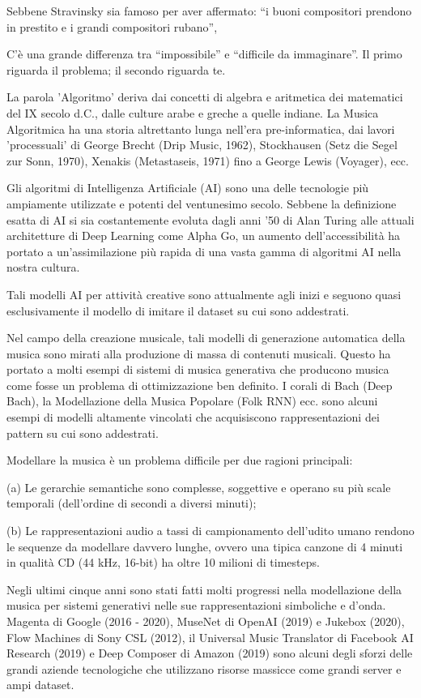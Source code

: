 \documentclass[a4paper,12pt]{report}
\begin{document}
Sebbene Stravinsky sia famoso per aver affermato: “i buoni compositori prendono in prestito e i grandi compositori rubano”, 

C’è una grande differenza tra “impossibile” e “difficile da immaginare”. 
Il primo riguarda il problema; il secondo riguarda te.

La parola 'Algoritmo' deriva dai concetti di algebra e aritmetica dei matematici del IX secolo d.C., dalle culture arabe e greche a quelle indiane. 
La Musica Algoritmica ha una storia altrettanto lunga nell'era pre-informatica, dai lavori 'processuali' di George Brecht (Drip Music, 1962), Stockhausen (Setz die Segel zur Sonn, 1970), Xenakis (Metastaseis, 1971) fino a George Lewis (Voyager), ecc.

Gli algoritmi di Intelligenza Artificiale (AI) sono una delle tecnologie più ampiamente utilizzate e potenti del ventunesimo secolo. Sebbene la definizione esatta di AI si sia costantemente evoluta dagli anni '50 di Alan Turing alle attuali architetture di Deep Learning come Alpha Go, 
un aumento dell'accessibilità ha portato a un'assimilazione più rapida di una vasta gamma di algoritmi AI nella nostra cultura. 

Tali modelli AI per attività creative sono attualmente agli inizi e seguono quasi esclusivamente il modello di imitare il dataset su cui sono addestrati. 

Nel campo della creazione musicale, tali modelli di generazione automatica della musica sono mirati alla produzione di massa di contenuti musicali. 
Questo ha portato a molti esempi di sistemi di musica generativa che producono musica come fosse un problema di ottimizzazione ben definito. 
I corali di Bach (Deep Bach), la Modellazione della Musica Popolare (Folk RNN) ecc. sono alcuni esempi di modelli altamente vincolati che acquisiscono rappresentazioni dei pattern su cui sono addestrati.

Modellare la musica è un problema difficile per due ragioni principali:

(a) Le gerarchie semantiche sono complesse, soggettive e operano su più scale temporali (dell'ordine di secondi a diversi minuti);

(b) Le rappresentazioni audio a tassi di campionamento dell'udito umano rendono le sequenze da modellare davvero lunghe, ovvero una tipica canzone di 4 minuti in qualità CD (44 kHz, 16-bit) ha oltre 10 milioni di timesteps.

Negli ultimi cinque anni sono stati fatti molti progressi nella modellazione della musica per sistemi generativi nelle sue rappresentazioni simboliche e d'onda. 
Magenta di Google (2016 - 2020), MuseNet di OpenAI (2019) e Jukebox (2020), Flow Machines di Sony CSL (2012), il Universal Music Translator di Facebook AI Research (2019) e Deep Composer di Amazon (2019)
sono alcuni degli sforzi delle grandi aziende tecnologiche che utilizzano risorse massicce come grandi server e ampi dataset. 
\end{document}
